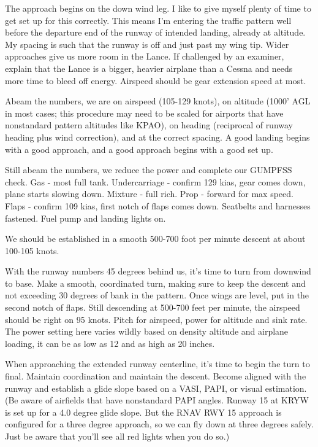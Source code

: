 The approach begins on the down wind leg. I like to give myself plenty of time to get set up for this correctly. This means I'm entering the traffic pattern well before the departure end of the runway of intended landing, already at altitude. My spacing is such that the runway is off and just past my wing tip. Wider approaches give us more room in the Lance. If challenged by an examiner, explain that the Lance is a bigger, heavier airplane than a Cessna and needs more time to bleed off energy. Airspeed should be gear extension speed at most.

Abeam the numbers, we are on airspeed (105-129 knots), on altitude (1000' AGL in most cases; this procedure may need to be scaled for airports that have nonstandard pattern altitudes like KPAO), on heading (reciprocal of runway heading plus wind correction), and at the correct spacing. A good landing begins with a good approach, and a good approach begins with a good set up.

Still abeam the numbers, we reduce the power and complete our GUMPFSS check. Gas - most full tank. Undercarriage - confirm 129 kias, gear comes down, plane starts slowing down. Mixture - full rich. Prop - forward for max speed. Flaps - confirm 109 kias, first notch of flaps comes down. Seatbelts and harnesses fastened. Fuel pump and landing lights on.

We should be established in a smooth 500-700 foot per minute descent at about 100-105 knots.

With the runway numbers 45 degrees behind us, it's time to turn from downwind to base. Make a smooth, coordinated turn, making sure to keep the descent and not exceeding 30 degrees of bank in the pattern. Once wings are level, put in the second notch of flaps. Still descending at 500-700 feet per minute, the airspeed should be right on 95 knots. Pitch for airspeed, power for altitude and sink rate. The power setting here varies wildly based on density altitude and airplane loading, it can be as low as 12 and as high as 20 inches.

When approaching the extended runway centerline, it's time to begin the turn to final. Maintain coordination and maintain the descent. Become aligned with the runway and establish a glide slope based on a VASI, PAPI, or visual estimation. (Be aware of airfields that have nonstandard PAPI angles. Runway 15 at KRYW is set up for a 4.0 degree glide slope. But the RNAV RWY 15 approach is configured for a three degree approach, so we can fly down at three degrees safely. Just be aware that you'll see all red lights when you do so.)

